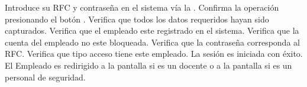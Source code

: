 \begin{UCtrayectoria}
	\UCpaso[\UCactor] Introduce su RFC y contraseña en el sistema vía la \label{CU01.introduceDatos}.
	\UCpaso[\UCactor] Confirma la operación presionando el botón .
	\UCpaso Verifica que todos los datos requeridos hayan sido capturados.
	\UCpaso Verifica que el empleado este registrado en el sistema.
	\UCpaso Verifica que la cuenta del empleado no este bloqueada.
	\UCpaso Verifica que la contraseña corresponda al RFC.
	\UCpaso Verifica que tipo acceso tiene este empleado.
	\UCpaso La sesión es iniciada con éxito.
	\UCpaso El Empleado es redirigido a la pantalla  si es un docente o a la pantalla  si es un personal de seguridad.
	
\end{UCtrayectoria}






